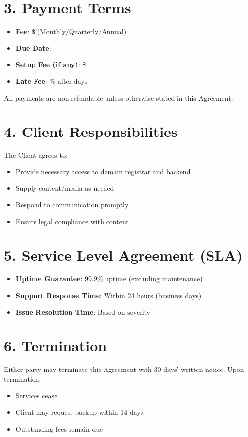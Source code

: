 \documentclass[12pt]{article}
\begin{document}
\section*{3. Payment Terms}
\begin{itemize}[noitemsep]
    \item \textbf{Fee}: \$\underline{\hspace{2cm}} (Monthly/Quarterly/Annual)
    \item \textbf{Due Date}: \underline{\hspace{3cm}}
    \item \textbf{Setup Fee (if any)}: \$\underline{\hspace{2cm}}
    \item \textbf{Late Fee}: \underline{\hspace{1cm}}\% after \underline{\hspace{1cm}} days
\end{itemize}

All payments are non-refundable unless otherwise stated in this Agreement.

\section*{4. Client Responsibilities}
The Client agrees to:
\begin{itemize}[noitemsep]
    \item Provide necessary access to domain registrar and backend
    \item Supply content/media as needed
    \item Respond to communication promptly
    \item Ensure legal compliance with content
\end{itemize}

\section*{5. Service Level Agreement (SLA)}
\begin{itemize}[noitemsep]
    \item \textbf{Uptime Guarantee}: 99.9\% uptime (excluding maintenance)
    \item \textbf{Support Response Time}: Within 24 hours (business days)
    \item \textbf{Issue Resolution Time}: Based on severity
\end{itemize}

\section*{6. Termination}
Either party may terminate this Agreement with 30 days’ written notice. Upon termination:
\begin{itemize}[noitemsep]
    \item Services cease
    \item Client may request backup within 14 days
    \item Outstanding fees remain due
\end{itemize}
\end{document}

